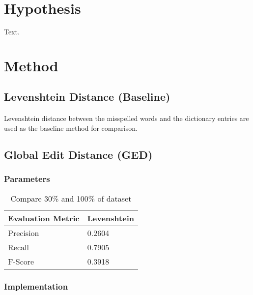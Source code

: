 \documentclass[11pt]{article}
\begin{document}
\section{Hypothesis}

Text.

\section{Method}

\subsection{Levenshtein Distance (Baseline)}

\paragraph{} Levenshtein distance between the misspelled words and the dictionary entries are used as the baseline method for comparison.

\subsection{Global Edit Distance (GED)}

\subsubsection{Parameters}

\begin{table}[h]
 \begin{center}
\begin{tabular}{| l | l |}

      \hline
      Evaluation Metric & Levenshtein \\
      \hline\hline
      Precision & 0.2604 \\
      Recall & 0.7905 \\
      F-Score & 0.3918 \\
      \hline

\end{tabular}
\caption{Compare 30\% and 100\% of dataset}\label{table1}
 \end{center}
\end{table}

\subsubsection{Implementation}
\end{document}
